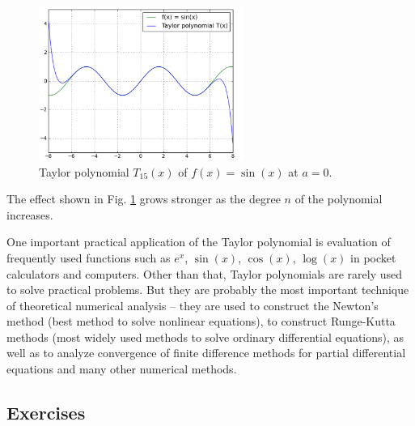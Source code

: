 \documentclass{article}
\begin{document}
\begin{figure}[!ht]
\begin{center}
\includegraphics[width=0.6\textwidth]{img/taylor-4.png}
\end{center}
\vspace{-2mm}
\caption{Taylor polynomial $T_{15}(x)$ of $f(x) = \sin(x)$ at $a = 0$.}
\label{fig:taylor-4}
\end{figure}
\noindent
The effect shown in Fig.  \ref{fig:taylor-4} grows stronger as the degree 
$n$ of the polynomial increases. 

One important practical application of the Taylor polynomial is evaluation of 
frequently used functions such as $e^x$, $\sin(x)$, $\cos(x)$, $\log(x)$ 
in pocket calculators and computers. 
Other than that, Taylor polynomials are rarely used to solve practical problems.
But they are probably the most 
important technique of theoretical numerical analysis -- they are used to construct
the Newton's method (best method to solve nonlinear equations), to construct 
Runge-Kutta methods (most widely used methods to solve ordinary differential 
equations), as well as to analyze convergence of finite difference methods 
for partial differential equations and many other numerical methods. 

\subsection{Exercises}
\end{document}
